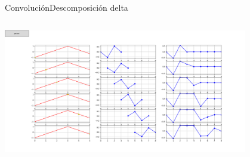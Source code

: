 \begin{frame}{Convolución}{Descomposición delta}
   \begin{columns}[c]
      \begin{column}{1\textwidth}
         \centering\includegraphics[width=0.8\textwidth]{4_clase/descomposicion_delta}
      \end{column}
   \end{columns}
   \vfill
\end{frame}
